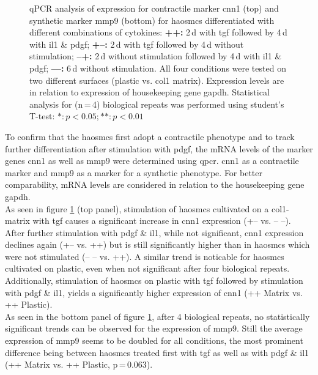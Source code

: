 \begin{figure}[h!]
    	\begin{minipage}{\captionwidth}
    		\caption[CNN_qPCR]{ \newline qPCR analysis of expression for contractile marker \ac{cnn1} (top) and synthetic marker \ac{mmp9} (bottom) for \acp{haosmc} differentiated with different combinations of cytokines:
            \textbf{++:} 2\,d with \ac{tgf} followed by 4\,d with \ac{il1} \& \ac{pdgf};
            \textbf{+–:} 2\,d with \ac{tgf} followed by 4\,d without stimulation;
            \textbf{–+:} 2\,d without stimulation followed by 4\,d with \ac{il1} \& \ac{pdgf};
            \textbf{––:} 6\,d without stimulation.
            All four conditions were tested on two different surfaces (plastic vs. \ac{col1} matrix). Expression levels are in relation to expression of housekeeping gene \ac{gapdh}. Statistical analysis for (n\,=\,4) biological repeats was performed using student's T-test: $*: p < 0.05; **: p < 0.01$}
    		\label{fig:qPCR}
    	\end{minipage}
    \end{figure}

    To confirm that the \acp{haosmc} first adopt a contractile phenotype and to track further differentiation after stimulation with \ac{pdgf}, the \ac{mRNA} levels of the marker genes \ac{cnn1} as well as \ac{mmp9} were determined using \ac{qpcr}. \ac{cnn1} as a contractile marker and \ac{mmp9} as a marker for a synthetic phenotype. For better comparability, \ac{mRNA} levels are considered in relation to the housekeeping gene \ac{gapdh}.\\
    As seen in figure \ref{fig:qPCR} (top panel), stimulation of \acp{haosmc} cultivated on a \ac{col1}-matrix with \ac{tgf} causes a significant increase in \ac{cnn1} expression (+– vs. – –). After further stimulation with \ac{pdgf} \& \ac{il1}, while not significant, \ac{cnn1} expression declines again (+– vs. ++) but is still significantly higher than in \acp{haosmc} which were not stimulated (– – vs. ++). A similar trend is noticable for \acp{haosmc} cultivated on plastic, even when not significant after four biological repeats. Additionally, stimulation of \acp{haosmc} on plastic with \ac{tgf} followed by stimulation with \ac{pdgf} \& \ac{il1}, yields a significantly higher expression of \ac{cnn1} (++ Matrix vs. ++ Plastic).\\
    As seen in the bottom panel of figure \ref{fig:qPCR}, after 4 biological repeats, no statistically significant trends can be observed for the expression of \ac{mmp9}. Still the average expression of \ac{mmp9} seems to be doubled for all conditions, the most prominent difference being between \acp{haosmc} treated first with \ac{tgf} as well as with \ac{pdgf} \& \ac{il1} (++ Matrix vs. ++ Plastic, p\,=\,0.063).


